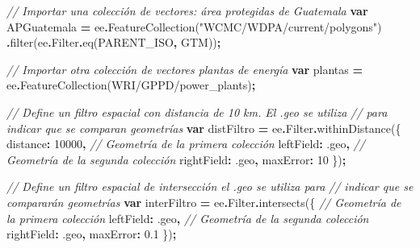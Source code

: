 \documentclass[
  12pt,
  letterpaper,
  twoside]{book}
\newenvironment{Shaded}{\begin{snugshade}}{\end{snugshade}}
\newcommand{\AttributeTok}[1]{\textcolor[rgb]{0.77,0.63,0.00}{#1}}
\newcommand{\CommentTok}[1]{\textcolor[rgb]{0.56,0.35,0.01}{\textit{#1}}}
\newcommand{\DataTypeTok}[1]{\textcolor[rgb]{0.13,0.29,0.53}{#1}}
\newcommand{\DecValTok}[1]{\textcolor[rgb]{0.00,0.00,0.81}{#1}}
\newcommand{\FloatTok}[1]{\textcolor[rgb]{0.00,0.00,0.81}{#1}}
\newcommand{\FunctionTok}[1]{\textcolor[rgb]{0.00,0.00,0.00}{#1}}
\newcommand{\KeywordTok}[1]{\textcolor[rgb]{0.13,0.29,0.53}{\textbf{#1}}}
\newcommand{\NormalTok}[1]{#1}
\newcommand{\OperatorTok}[1]{\textcolor[rgb]{0.81,0.36,0.00}{\textbf{#1}}}
\newcommand{\StringTok}[1]{\textcolor[rgb]{0.31,0.60,0.02}{#1}}
\begin{document}
\begin{Shaded}
\begin{Highlighting}[]
\CommentTok{// Importar una colección de vectores: área protegidas de Guatemala}
\KeywordTok{var}\NormalTok{ APGuatemala }\OperatorTok{=}\NormalTok{ ee}\OperatorTok{.}\FunctionTok{FeatureCollection}\NormalTok{(}\StringTok{"WCMC/WDPA/current/polygons"}\NormalTok{)}
  \OperatorTok{.}\FunctionTok{filter}\NormalTok{(ee}\OperatorTok{.}\AttributeTok{Filter}\OperatorTok{.}\FunctionTok{eq}\NormalTok{(}\StringTok{\textquotesingle{}PARENT\_ISO\textquotesingle{}}\OperatorTok{,} \StringTok{\textquotesingle{}GTM\textquotesingle{}}\NormalTok{))}\OperatorTok{;}

\CommentTok{// Importar otra colección de vectores plantas de energía}
\KeywordTok{var}\NormalTok{ plantas }\OperatorTok{=}\NormalTok{ ee}\OperatorTok{.}\FunctionTok{FeatureCollection}\NormalTok{(}\StringTok{\textquotesingle{}WRI/GPPD/power\_plants\textquotesingle{}}\NormalTok{)}\OperatorTok{;}

\CommentTok{// Define un filtro espacial con distancia de 10 km. El .geo se utiliza }
\CommentTok{// para indicar que se comparan geometrías}
\KeywordTok{var}\NormalTok{ distFiltro }\OperatorTok{=}\NormalTok{ ee}\OperatorTok{.}\AttributeTok{Filter}\OperatorTok{.}\FunctionTok{withinDistance}\NormalTok{(\{}
  \DataTypeTok{distance}\OperatorTok{:} \DecValTok{10000}\OperatorTok{,}
  \CommentTok{// Geometría de la primera colección}
  \DataTypeTok{leftField}\OperatorTok{:} \StringTok{\textquotesingle{}.geo\textquotesingle{}}\OperatorTok{,} 
  \CommentTok{// Geometría de la segunda colección}
  \DataTypeTok{rightField}\OperatorTok{:} \StringTok{\textquotesingle{}.geo\textquotesingle{}}\OperatorTok{,} 
  \DataTypeTok{maxError}\OperatorTok{:} \DecValTok{10}
\NormalTok{\})}\OperatorTok{;}

\CommentTok{// Define un filtro espacial de intersección el .geo se utiliza para }
\CommentTok{// indicar que se compararán geometrías}
\KeywordTok{var}\NormalTok{ interFiltro }\OperatorTok{=}\NormalTok{ ee}\OperatorTok{.}\AttributeTok{Filter}\OperatorTok{.}\FunctionTok{intersects}\NormalTok{(\{}
  \CommentTok{// Geometría de la primera colección}
  \DataTypeTok{leftField}\OperatorTok{:} \StringTok{\textquotesingle{}.geo\textquotesingle{}}\OperatorTok{,} 
  \CommentTok{// Geometría de la segunda colección}
  \DataTypeTok{rightField}\OperatorTok{:} \StringTok{\textquotesingle{}.geo\textquotesingle{}}\OperatorTok{,} 
  \DataTypeTok{maxError}\OperatorTok{:} \FloatTok{0.1}
\NormalTok{\})}\OperatorTok{;}


\end{Highlighting}
\end{Shaded}
\end{document}
